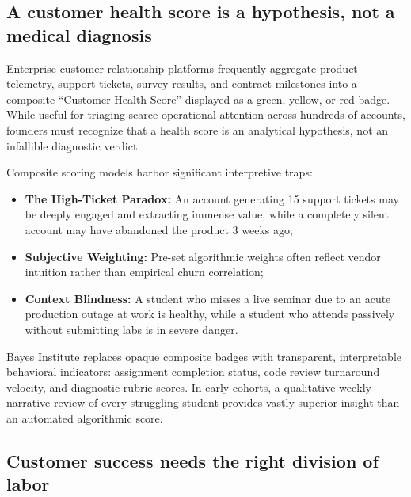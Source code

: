 \subsection{A customer health score is a hypothesis, not a medical diagnosis}

Enterprise customer relationship platforms frequently aggregate product telemetry, support tickets, survey results, and contract milestones into a composite ``Customer Health Score'' displayed as a green, yellow, or red badge. While useful for triaging scarce operational attention across hundreds of accounts, founders must recognize that a health score is an analytical hypothesis, not an infallible diagnostic verdict.

Composite scoring models harbor significant interpretive traps:
\begin{itemize}
\item \textbf{The High-Ticket Paradox:} An account generating 15 support tickets may be deeply engaged and extracting immense value, while a completely silent account may have abandoned the product 3 weeks ago;
\item \textbf{Subjective Weighting:} Pre-set algorithmic weights often reflect vendor intuition rather than empirical churn correlation;
\item \textbf{Context Blindness:} A student who misses a live seminar due to an acute production outage at work is healthy, while a student who attends passively without submitting labs is in severe danger.
\end{itemize}
Bayes Institute replaces opaque composite badges with transparent, interpretable behavioral indicators: assignment completion status, code review turnaround velocity, and diagnostic rubric scores. In early cohorts, a qualitative weekly narrative review of every struggling student provides vastly superior insight than an automated algorithmic score.

\subsection{Customer success needs the right division of labor}

